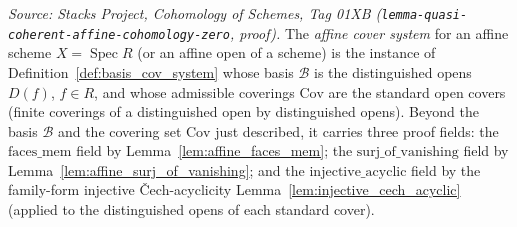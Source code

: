 \begin{definition}\leanok
  \label{def:affine_cover_system}
  \textit{Source: Stacks Project, Cohomology of Schemes, Tag 01XB
  (\texttt{lemma-quasi-coherent-affine-cohomology-zero}, proof).}
  The \emph{affine cover system} for an affine scheme \(X = \operatorname{Spec} R\) (or an affine open
  of a scheme) is the instance of Definition~\ref{def:basis_cov_system} whose basis \(\mathcal{B}\) is
  the distinguished opens \(D(f)\), \(f \in R\), and whose admissible coverings \(\mathrm{Cov}\) are
  the standard open covers (finite coverings of a distinguished open by distinguished opens). Beyond
  the basis \(\mathcal{B}\) and the covering set \(\mathrm{Cov}\) just described, it carries three
  proof fields: the \(\mathrm{faces\_mem}\) field by Lemma~\ref{lem:affine_faces_mem}; the
  \(\mathrm{surj\_of\_vanishing}\) field by Lemma~\ref{lem:affine_surj_of_vanishing}; and the
  \(\mathrm{injective\_acyclic}\) field by the family-form injective {\v C}ech-acyclicity
  Lemma~\ref{lem:injective_cech_acyclic} (applied to the distinguished opens of each standard cover).
\end{definition}

